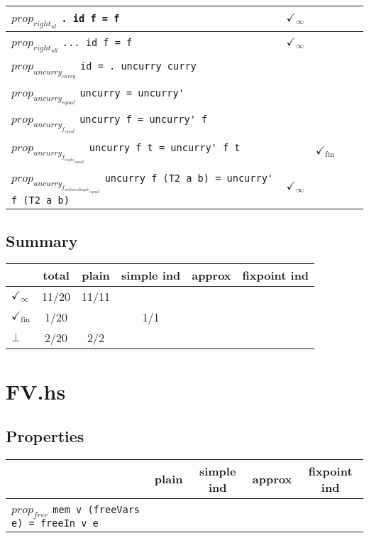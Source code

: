 \documentclass{article}
\begin{document}
\begin{longtable}{p{10cm} || c | c | c | c | }
\hline
$prop_{right_{id}}$ \newline \verb`. id f = f` & $\checkmark_{\infty}$ &  &  &  \\
\hline
$prop_{right_{idl}}$ \newline \verb`... id f = f` & $\checkmark_{\infty}$ &  &  &  \\
\hline
$prop_{uncurry_{curry}}$ \newline \verb`id = . uncurry curry` &  &  &  &  \\
\hline
$prop_{uncurry_{equal}}$ \newline \verb`uncurry = uncurry'` &  &  &  &  \\
\hline
$prop_{uncurry_{f_{equal}}}$ \newline \verb`uncurry f = uncurry' f` &  &  &  &  \\
\hline
$prop_{uncurry_{f_{tuple_{equal}}}}$ \newline \verb`uncurry f t = uncurry' f t` &  & $\checkmark_{\mathrm{fin}}$ &  &  \\
\hline
$prop_{uncurry_{f_{unboxedtuple_{equal}}}}$ \newline \verb`uncurry f (T2 a b) = uncurry' f (T2 a b)` & $\checkmark_{\infty}$ &  &  &  \\
\end{longtable}

\subsection*{Summary}
\begin{longtable}{p{4cm} || c | c | c | c | c | }
  & total & plain & simple ind & approx & fixpoint ind \\
\hline
$\checkmark_{\infty}$ & 11/20 & 11/11 &  &  & \\
\hline
$\checkmark_{\mathrm{fin}}$ & 1/20 &  & 1/1 &  & \\
\hline
$\bot$ & 2/20 & 2/2 &  &  & \\
\end{longtable}

\section*{FV.hs}
\subsection*{Properties}
\begin{longtable}{p{10cm} || c | c | c | c | }
  & plain & simple ind & approx & fixpoint ind \\
\hline
$prop_{free}$ \newline \verb`mem v (freeVars e) = freeIn v e` &  &  &  &  \\
\end{longtable}
\end{document}
